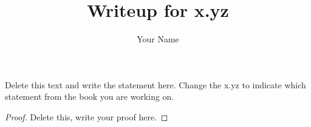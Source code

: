 \documentclass[12pt]{article}
\newenvironment{statement}[2][Statement]{\begin{trivlist}
\item[\hskip \labelsep {\bfseries #1}\hskip \labelsep {\bfseries #2.}]}{\end{trivlist}}
\begin{document}
 
%
%
 
\title{Writeup for x.yz} %
\author{Your Name} %
\maketitle


\begin{statement}{x.yz} %
Delete this text and write the statement here. Change the x.yz to indicate which statement from the book you are working on.
\end{statement}
 
\begin{proof}  


Delete this, write your proof here.



\end{proof}
 








 
\end{document}
